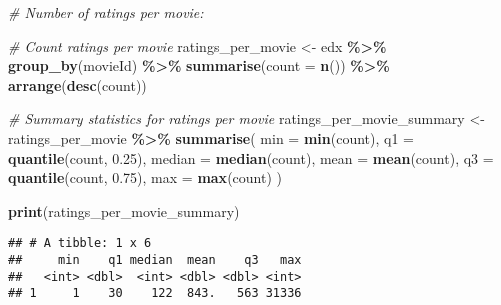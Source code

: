 \documentclass[
]{article}
\newenvironment{Shaded}{\begin{snugshade}}{\end{snugshade}}
\newcommand{\AttributeTok}[1]{\textcolor[rgb]{0.13,0.29,0.53}{#1}}
\newcommand{\CommentTok}[1]{\textcolor[rgb]{0.56,0.35,0.01}{\textit{#1}}}
\newcommand{\FloatTok}[1]{\textcolor[rgb]{0.00,0.00,0.81}{#1}}
\newcommand{\FunctionTok}[1]{\textcolor[rgb]{0.13,0.29,0.53}{\textbf{#1}}}
\newcommand{\NormalTok}[1]{#1}
\newcommand{\OtherTok}[1]{\textcolor[rgb]{0.56,0.35,0.01}{#1}}
\newcommand{\SpecialCharTok}[1]{\textcolor[rgb]{0.81,0.36,0.00}{\textbf{#1}}}
\begin{document}
\begin{Shaded}
\begin{Highlighting}[]
\CommentTok{\#  Number of ratings per movie:}

\CommentTok{\# Count ratings per movie}
\NormalTok{ratings\_per\_movie }\OtherTok{\textless{}{-}}\NormalTok{ edx }\SpecialCharTok{\%\textgreater{}\%}
  \FunctionTok{group\_by}\NormalTok{(movieId) }\SpecialCharTok{\%\textgreater{}\%}
  \FunctionTok{summarise}\NormalTok{(}\AttributeTok{count =} \FunctionTok{n}\NormalTok{()) }\SpecialCharTok{\%\textgreater{}\%}
  \FunctionTok{arrange}\NormalTok{(}\FunctionTok{desc}\NormalTok{(count))}

\CommentTok{\# Summary statistics for ratings per movie}
\NormalTok{ratings\_per\_movie\_summary }\OtherTok{\textless{}{-}}\NormalTok{ ratings\_per\_movie }\SpecialCharTok{\%\textgreater{}\%}
  \FunctionTok{summarise}\NormalTok{(}
    \AttributeTok{min =} \FunctionTok{min}\NormalTok{(count),}
    \AttributeTok{q1 =} \FunctionTok{quantile}\NormalTok{(count, }\FloatTok{0.25}\NormalTok{),}
    \AttributeTok{median =} \FunctionTok{median}\NormalTok{(count),}
    \AttributeTok{mean =} \FunctionTok{mean}\NormalTok{(count),}
    \AttributeTok{q3 =} \FunctionTok{quantile}\NormalTok{(count, }\FloatTok{0.75}\NormalTok{),}
    \AttributeTok{max =} \FunctionTok{max}\NormalTok{(count)}
\NormalTok{  )}

\FunctionTok{print}\NormalTok{(ratings\_per\_movie\_summary)}
\end{Highlighting}
\end{Shaded}

\begin{verbatim}
## # A tibble: 1 x 6
##     min    q1 median  mean    q3   max
##   <int> <dbl>  <int> <dbl> <dbl> <int>
## 1     1    30    122  843.   563 31336
\end{verbatim}
\end{document}
